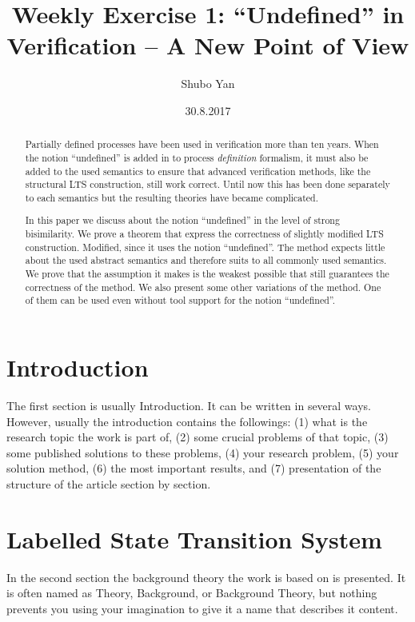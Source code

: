 \documentclass[a4paper,12pt]{article}
\title{ Weekly Exercise 1: ``Undefined'' in Verification -- A New Point of View}
\author{Shubo Yan }
\date{30.8.2017}
\begin{document}
\maketitle
\begin{abstract}
Partially defined processes have been used in verification more than ten years. When the notion ``undefined'' is added in to process \emph{definition} formalism, it must also be added to the used semantics to ensure that advanced verification methods, like the structural LTS construction, still work correct. Until now this has been done separately to each semantics but the resulting theories have became complicated.

In this paper we discuss about the notion ``undefined'' in the level of strong bisimilarity. We prove a theorem that express the correctness of slightly modified LTS construction. Modified, since it uses the notion ``undefined''. The method expects little about the used abstract semantics and therefore suits to all commonly used semantics. We prove that the assumption it makes is the weakest possible that still guarantees the correctness of the method. We also present some other variations of the method. One of them can be used even without tool support for the notion ``undefined''.


\end{abstract}

\maketitle

\tableofcontents

\section{Introduction}
The first section is usually Introduction. It can be written in several ways. However, usually the introduction contains the followings:
(1) what is the research topic the work is part of, 
(2) some crucial problems of that topic, 
(3) some published solutions to these problems, 
(4) your research problem, (5) your solution method, 
(6) the most important results, and 
(7) presentation of the structure of the article section by section.

\section{Labelled State Transition System}

In the second section the background theory the work is based on is presented. It is often named as Theory, Background, or Background Theory, but nothing prevents you using your imagination to give it a name that describes it content.
\end{document}
